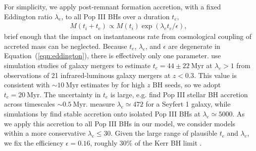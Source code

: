 \documentclass[twocolumn,twocolappendix]{aastex631}
\begin{document}
\begin{appendix}
For simplicity, we apply post-remnant formation accretion, with a fixed Eddington ratio $\lambda_e$, to all Pop III BHs over a duration $t_e$,
  \begin{align}
  M(t_i + t_e) \propto M(t_i)\exp\left(\lambda_et_e/\epsilon\right), \label{eqn:eddington}
\end{align}
brief enough that the impact on instantaneous rate from cosmological coupling of accreted mass can be neglected.
Because $t_e$, $\lambda_e$, and $\epsilon$ are degenerate in Equation~(\ref{eqn:eddington}), there is effectively only one parameter.
\citet{farrah22} use simulation studies of galaxy mergers to estimate $t_e = 44\pm 22~\mathrm{Myr}$ at $\lambda_e > 1$ from observations of 21 infrared-luminous galaxy mergers at $z<0.3$.
This value is consistent with $\sim 10~\mathrm{Myr}$ estimates by \citet{madau2014super} for high $z$ BH seeds, so we adopt $t_e = 20~\mathrm{Myr}$.
The uncertainty in $t_e$ is large, e.g. \citet{safarz20} find Pop III stellar BH accretion across timescales ${\sim 0.5~\mathrm{Myr}}$.
\citet{tortosa22} measure $\lambda_e \simeq 472$ for a Seyfert 1 galaxy, while simulations by \citet{inayoshihyper2016} find stable accretion onto isolated Pop III BHs at $\lambda_e \simeq 5000$.
As we apply this accretion to all Pop III BHs in our model, we consider models within a more conservative $\lambda_e \leqslant 30$.
Given the large range of plausible $t_e$ and $\lambda_e$, we fix the efficiency $\epsilon = 0.16$, roughly $30\%$ of the Kerr BH limit \citep[e.g.][]{bardeen1970kerr}.


\end{appendix}
\end{document}
